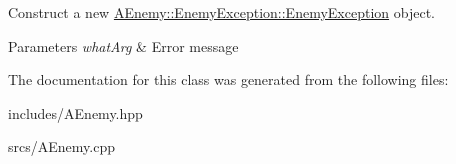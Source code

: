 Construct a new \hyperlink{class_a_enemy_1_1_enemy_exception_aa463446d198b1ce403465ad67a4d5513}{A\+Enemy\+::\+Enemy\+Exception\+::\+Enemy\+Exception} object. 


\begin{DoxyParams}{Parameters}
{\em what\+Arg} & Error message \\
\hline
\end{DoxyParams}


The documentation for this class was generated from the following files\+:\begin{DoxyCompactItemize}
\item 
includes/A\+Enemy.\+hpp\item 
srcs/A\+Enemy.\+cpp\end{DoxyCompactItemize}
